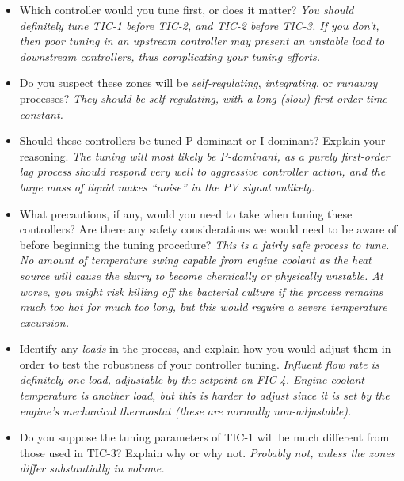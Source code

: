 \begin{itemize}
\item{} Which controller would you tune first, or does it matter? {\it You should definitely tune TIC-1 before TIC-2, and TIC-2 before TIC-3.  If you don't, then poor tuning in an upstream controller may present an unstable load to downstream controllers, thus complicating your tuning efforts.}
\vskip 10pt
\item{} Do you suspect these zones will be {\it self-regulating}, {\it integrating}, or {\it runaway} processes? {\it They should be self-regulating, with a long (slow) first-order time constant.}
\vskip 10pt
\item{} Should these controllers be tuned P-dominant or I-dominant?  Explain your reasoning.  {\it The tuning will most likely be P-dominant, as a purely first-order lag process should respond very well to aggressive controller action, and the large mass of liquid makes ``noise'' in the PV signal unlikely.}
\vskip 10pt
\item{} What precautions, if any, would you need to take when tuning these controllers?  Are there any safety considerations we would need to be aware of before beginning the tuning procedure? {\it This is a fairly safe process to tune.  No amount of temperature swing capable from engine coolant as the heat source will cause the slurry to become chemically or physically unstable.  At worse, you might risk killing off the bacterial culture if the process remains much too hot for much too long, but this would require a severe temperature excursion.}
\vskip 10pt
\item{} Identify any {\it loads} in the process, and explain how you would adjust them in order to test the robustness of your controller tuning. {\it Influent flow rate is definitely one load, adjustable by the setpoint on FIC-4.  Engine coolant temperature is another load, but this is harder to adjust since it is set by the engine's mechanical thermostat (these are normally non-adjustable).}
\vskip 10pt
\item{} Do you suppose the tuning parameters of TIC-1 will be much different from those used in TIC-3?  Explain why or why not. {\it Probably not, unless the zones differ substantially in volume.}
\vskip 10pt

\end{itemize}
